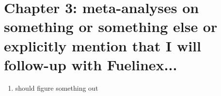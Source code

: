 \documentclass{article}
\begin{document}
\section*{Chapter 3: meta-analyses on something or something else or explicitly mention that I will follow-up with Fuelinex...}
\begin {enumerate}
	\item should figure something out
\end {enumerate}

%
\end{document}
